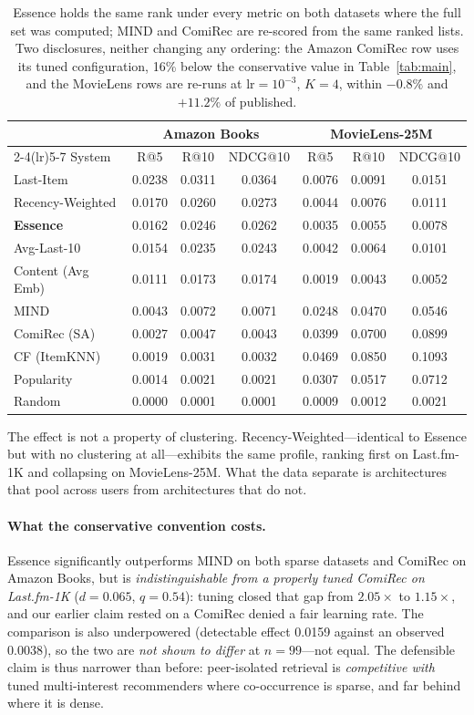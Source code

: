 \documentclass[runningheads]{llncs}
\begin{document}
\begin{table}[t]
\caption{Essence holds the same rank under every metric on both datasets where the full
set was computed; MIND and ComiRec are re-scored from the same ranked lists. Two
disclosures, neither changing any ordering: the Amazon ComiRec row uses its tuned
configuration, 16\% below the conservative value in Table~\ref{tab:main}, and the
MovieLens rows are re-runs at $\mathrm{lr}=10^{-3}$, $K=4$, within $-0.8\%$ and $+11.2\%$
of published.}\label{tab:metrics}
\centering
\small
\begin{tabular}{@{}lcccccc@{}}
\toprule
& \multicolumn{3}{c}{Amazon Books} & \multicolumn{3}{c}{MovieLens-25M} \\
\cmidrule(lr){2-4}\cmidrule(lr){5-7}
System & R@5 & R@10 & NDCG@10 & R@5 & R@10 & NDCG@10 \\
\midrule
Last-Item & 0.0238 & 0.0311 & 0.0364 & 0.0076 & 0.0091 & 0.0151 \\
Recency-Weighted & 0.0170 & 0.0260 & 0.0273 & 0.0044 & 0.0076 & 0.0111 \\
\textbf{Essence} & 0.0162 & 0.0246 & 0.0262 & 0.0035 & 0.0055 & 0.0078 \\
Avg-Last-10 & 0.0154 & 0.0235 & 0.0243 & 0.0042 & 0.0064 & 0.0101 \\
Content (Avg Emb) & 0.0111 & 0.0173 & 0.0174 & 0.0019 & 0.0043 & 0.0052 \\
MIND & 0.0043 & 0.0072 & 0.0071 & 0.0248 & 0.0470 & 0.0546 \\
ComiRec (SA) & 0.0027 & 0.0047 & 0.0043 & 0.0399 & 0.0700 & 0.0899 \\
CF (ItemKNN) & 0.0019 & 0.0031 & 0.0032 & 0.0469 & 0.0850 & 0.1093 \\
Popularity & 0.0014 & 0.0021 & 0.0021 & 0.0307 & 0.0517 & 0.0712 \\
Random & 0.0000 & 0.0001 & 0.0001 & 0.0009 & 0.0012 & 0.0021 \\
\bottomrule
\end{tabular}
\end{table}

The effect is not a property of clustering. Recency-Weighted---identical to Essence but
with no clustering at all---exhibits the same profile, ranking first on Last.fm-1K and
collapsing on MovieLens-25M. What the data separate is architectures that pool across users
from architectures that do not.

\paragraph{What the conservative convention costs.} Essence significantly outperforms
MIND on both sparse datasets and ComiRec on Amazon Books, but is \emph{indistinguishable
from a properly tuned ComiRec on Last.fm-1K} ($d=0.065$, $q=0.54$): tuning closed that gap
from $2.05\times$ to $1.15\times$, and our earlier claim rested on a ComiRec denied a fair
learning rate. The comparison is also underpowered (detectable effect 0.0159 against an
observed 0.0038), so the two are \emph{not shown to differ} at $n=99$---not equal. The
defensible claim is thus narrower than before: peer-isolated retrieval is \emph{competitive
with} tuned multi-interest recommenders where co-occurrence is sparse, and far behind where
it is dense.
\end{document}
